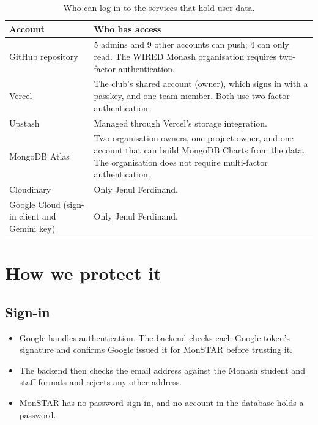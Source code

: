 \documentclass[11pt,a4paper]{article}
\begin{document}
\begin{table}[htbp]
  \centering
  \small
  \renewcommand{\arraystretch}{1.25}
  \begin{tabularx}{\textwidth}{@{}P{3.6cm}L@{}}
    \toprule
    \textbf{Account} & \textbf{Who has access} \\
    \midrule
    GitHub repository & 5 admins and 9 other accounts can push; 4 can only
      read.  The WIRED Monash organisation requires two-factor
      authentication. \\
    Vercel & The club's shared account (owner), which signs in with a
      passkey, and one team member.  Both use two-factor authentication. \\
    Upstash & Managed through Vercel's storage integration. \\
    MongoDB Atlas & Two organisation owners, one project owner, and one
      account that can build MongoDB Charts from the data.  The organisation
      does not require multi-factor authentication. \\
    Cloudinary & Only Jenul Ferdinand. \\
    Google Cloud (sign-in client and Gemini key) & Only Jenul Ferdinand. \\
    \bottomrule
  \end{tabularx}
  \caption{Who can log in to the services that hold user data.}
  \label{tab:infra}
\end{table}

\section{How we protect it}
\label{sec:security}

\subsection{Sign-in}

\begin{itemize}
  \item Google handles authentication.  The backend checks each Google
    token's signature and confirms Google issued it for MonSTAR before
    trusting it.
  \item The backend then checks the email address against the Monash student
    and staff formats and rejects any other address.
  \item MonSTAR has no password sign-in, and no account in the database
    holds a password.
\end{itemize}
\end{document}
